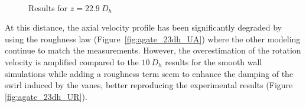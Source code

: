 \begin{figure}[!h]
\centering
{}
\\
\caption{Results for $z=22.9\ D_{h}$}
\label{fig:agate_cfd_23dh}
\end{figure}


\npar

At this distance, the axial velocity profile has been significantly degraded by using the roughness law (Figure\ \ref{fig:agate_23dh_UA}) where the other modeling continue to match the measurements. However, the overestimation of the rotation velocity is amplified compared to the $10\ D_{h}$ results for the smooth wall simulations while adding a roughness term seem to enhance the damping of the swirl induced by the vanes, better reproducing the experimental results (Figure \ref{fig:agate_23dh_UR}).

